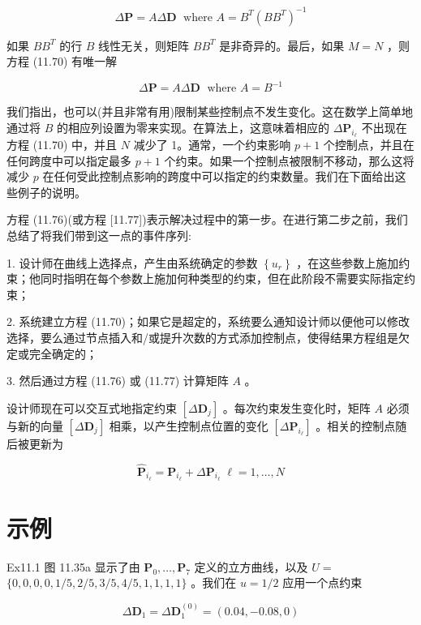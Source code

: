\documentclass[../main.tex]{subfiles}
\begin{document}
\[
\Delta \mathbf{P} = {A\Delta }\mathbf{D}\;\text{ where }A = {B}^{T}{\left( B{B}^{T}\right) }^{-1} \tag{11.76}
\]

如果 \(B{B}^{T}\) 的行 \(B\) 线性无关，则矩阵 \(B{B}^{T}\) 是非奇异的。最后，如果 \(M = N\) ，则方程 (11.70) 有唯一解

\[
\Delta \mathbf{P} = {A\Delta }\mathbf{D}\;\text{ where }A = {B}^{-1} \tag{11.77}
\]

我们指出，也可以(并且非常有用)限制某些控制点不发生变化。这在数学上简单地通过将 \(B\) 的相应列设置为零来实现。在算法上，这意味着相应的 \(\Delta {\mathbf{P}}_{{i}_{\ell }}\) 不出现在方程 (11.70) 中，并且 \(N\) 减少了 1。通常，一个约束影响 \(p + 1\) 个控制点，并且在任何跨度中可以指定最多 \(p + 1\) 个约束。如果一个控制点被限制不移动，那么这将减少 \(p\) 在任何受此控制点影响的跨度中可以指定的约束数量。我们在下面给出这些例子的说明。

方程 (11.76)(或方程 [11.77])表示解决过程中的第一步。在进行第二步之前，我们总结了将我们带到这一点的事件序列:

1. 设计师在曲线上选择点，产生由系统确定的参数 \(\left\{  {u}_{r}\right\}\) ，在这些参数上施加约束；他同时指明在每个参数上施加何种类型的约束，但在此阶段不需要实际指定约束；

2. 系统建立方程 (11.70)；如果它是超定的，系统要么通知设计师以便他可以修改选择，要么通过节点插入和/或提升次数的方式添加控制点，使得结果方程组是欠定或完全确定的；

3. 然后通过方程 (11.76) 或 (11.77) 计算矩阵 \(A\) 。

设计师现在可以交互式地指定约束 \(\left\lbrack  {\Delta {\mathbf{D}}_{j}}\right\rbrack\) 。每次约束发生变化时，矩阵 \(A\) 必须与新的向量 \(\left\lbrack  {\Delta {\mathbf{D}}_{j}}\right\rbrack\) 相乘，以产生控制点位置的变化 \(\left\lbrack  {\Delta {\mathbf{P}}_{{i}_{\ell }}}\right\rbrack\) 。相关的控制点随后被更新为

\[
{\widehat{\mathbf{P}}}_{{i}_{\ell }} = {\mathbf{P}}_{{i}_{\ell }} + \Delta {\mathbf{P}}_{{i}_{\ell }}\;\ell  = 1,\ldots ,N \tag{11.78}
\]

\section*{示例}

Ex11.1 图 11.35a 显示了由 \({\mathbf{P}}_{0},\ldots ,{\mathbf{P}}_{7}\) 定义的立方曲线，以及 \(U =\)  \(\{ 0,0,0,0,1/5,2/5,3/5,4/5,1,1,1,1\}\) 。我们在 \(u = 1/2\) 应用一个点约束

\[
\Delta {\mathbf{D}}_{1} = \Delta {\mathbf{D}}_{1}^{\left( 0\right) } = \left( {{0.04}, - {0.08},0}\right)
\]
\end{document}
